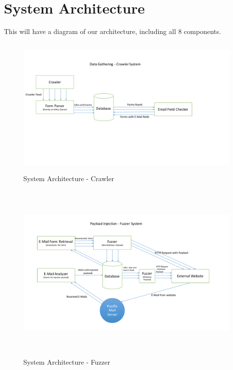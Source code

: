 \section{System Architecture}

This will have a diagram of our architecture, including all 8 components.

\begin{figure}
     \centering
     \includegraphics[width=16cm, height=7cm]{System/crawler_design}
     \caption{System Architecture - Crawler}
     \label{fig:crawler}
 \end{figure}
 
 
 \begin{figure}
 	\centering
 	\includegraphics[width=16cm, height=9cm]{System/fuzzer_design}
 	\caption{System Architecture - Fuzzer}
 	\label{fig:fuzzer}
 \end{figure}
 